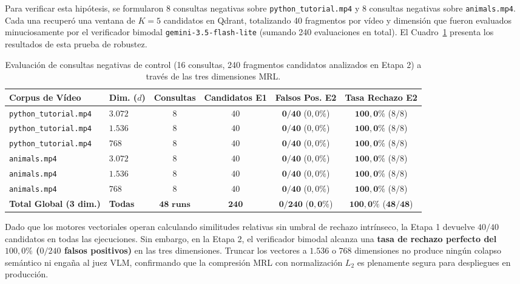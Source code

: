 Para verificar esta hipótesis, se formularon 8 consultas negativas sobre \texttt{python\_tutorial.mp4} y 8 consultas negativas sobre \texttt{animals.mp4}. Cada una recuperó una ventana de $K=5$ candidatos en Qdrant, totalizando 40 fragmentos por vídeo y dimensión que fueron evaluados minuciosamente por el verificador bimodal \texttt{gemini-3.5-flash-lite} (sumando 240 evaluaciones en total). El Cuadro~\ref{tab:ablacion_mrl_negativas} presenta los resultados de esta prueba de robustez.

\begin{table}[htbp]
\centering
\small
\setlength{\tabcolsep}{4.0pt}
\caption{Evaluación de consultas negativas de control (16 consultas, 240 fragmentos candidatos analizados en Etapa 2) a través de las tres dimensiones MRL.}
\label{tab:ablacion_mrl_negativas}
\begin{tabular}{llcccc}
\toprule
\textbf{Corpus de Vídeo} & \textbf{Dim. ($d$)} & \textbf{Consultas} & \textbf{Candidatos E1} & \textbf{Falsos Pos. E2} & \textbf{Tasa Rechazo E2} \\
\midrule
\texttt{python\_tutorial.mp4} & $3.072$ & $8$ & $40$ & $\mathbf{0/40}$ ($0,0\%$) & $\mathbf{100,0\%}$ ($8/8$) \\
\texttt{python\_tutorial.mp4} & $1.536$ & $8$ & $40$ & $\mathbf{0/40}$ ($0,0\%$) & $\mathbf{100,0\%}$ ($8/8$) \\
\texttt{python\_tutorial.mp4} & $768$   & $8$ & $40$ & $\mathbf{0/40}$ ($0,0\%$) & $\mathbf{100,0\%}$ ($8/8$) \\
\midrule
\texttt{animals.mp4}          & $3.072$ & $8$ & $40$ & $\mathbf{0/40}$ ($0,0\%$) & $\mathbf{100,0\%}$ ($8/8$) \\
\texttt{animals.mp4}          & $1.536$ & $8$ & $40$ & $\mathbf{0/40}$ ($0,0\%$) & $\mathbf{100,0\%}$ ($8/8$) \\
\texttt{animals.mp4}          & $768$   & $8$ & $40$ & $\mathbf{0/40}$ ($0,0\%$) & $\mathbf{100,0\%}$ ($8/8$) \\
\midrule
\textbf{Total Global (3 dim.)} & \textbf{Todas} & $\mathbf{48\text{ runs}}$ & $\mathbf{240}$ & $\mathbf{0/240}$ ($\mathbf{0,0\%}$) & $\mathbf{100,0\%}$ ($\mathbf{48/48}$) \\
\bottomrule
\end{tabular}
\end{table}

Dado que los motores vectoriales operan calculando similitudes relativas sin umbral de rechazo intrínseco, la Etapa 1 devuelve $40/40$ candidatos en todas las ejecuciones. Sin embargo, en la Etapa 2, el verificador bimodal alcanza una \textbf{tasa de rechazo perfecto del $100,0\%$ ($0/240$ falsos positivos)} en las tres dimensiones. Truncar los vectores a $1.536$ o $768$ dimensiones no produce ningún colapso semántico ni engaña al juez VLM, confirmando que la compresión MRL con normalización $L_2$ es plenamente segura para despliegues en producción.

